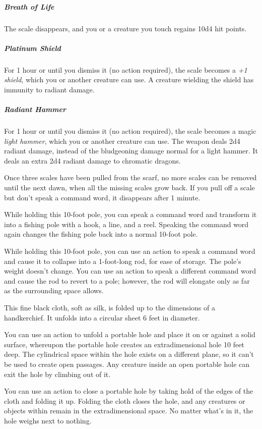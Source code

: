 \documentclass[10pt,a4paper,twoside,bg=print,twocolumn,openany,nodeprecatedcode]{dndbook}
\begin{document}
\subparagraph{Breath of Life}
The scale disappears, and you or a creature you touch regains 10d4 hit points.

\subparagraph{Platinum Shield}
For 1 hour or until you dismiss it (no action required), the scale becomes a \textit{+1 shield}, which you or another creature can use. A creature wielding the shield has immunity to radiant damage.

\subparagraph{Radiant Hammer}
For 1 hour or until you dismiss it (no action required), the scale becomes a magic \textit{light hammer}, which you or another creature can use. The weapon deals 2d4 radiant damage, instead of the bludgeoning damage normal for a light hammer. It deals an extra 2d4 radiant damage to chromatic dragons.

Once three scales have been pulled from the scarf, no more scales can be removed until the next dawn, when all the missing scales grow back. If you pull off a scale but don't speak a command word, it disappears after 1 minute.

While holding this 10-foot pole, you can speak a command word and transform it into a fishing pole with a hook, a line, and a reel. Speaking the command word again changes the fishing pole back into a normal 10-foot pole.

While holding this 10-foot pole, you can use an action to speak a command word and cause it to collapse into a 1-foot-long rod, for ease of storage. The pole's weight doesn't change. You can use an action to speak a different command word and cause the rod to revert to a pole; however, the rod will elongate only as far as the surrounding space allows.

This fine black cloth, soft as silk, is folded up to the dimensions of a handkerchief. It unfolds into a circular sheet 6 feet in diameter.

You can use an action to unfold a portable hole and place it on or against a solid surface, whereupon the portable hole creates an extradimensional hole 10 feet deep. The cylindrical space within the hole exists on a different plane, so it can't be used to create open passages. Any creature inside an open portable hole can exit the hole by climbing out of it.

You can use an action to close a portable hole by taking hold of the edges of the cloth and folding it up. Folding the cloth closes the hole, and any creatures or objects within remain in the extradimensional space. No matter what's in it, the hole weighs next to nothing.
\end{document}
